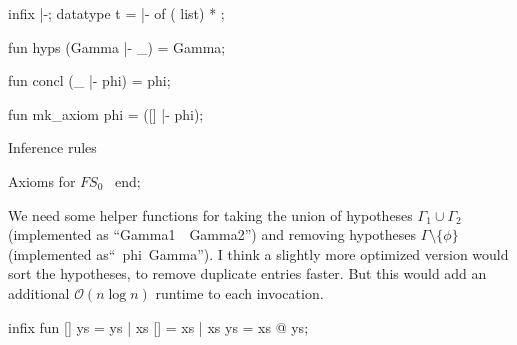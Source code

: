infix |-;
datatype t = |- of ( list) * ;

fun hyps (Gamma |- _) = Gamma;

fun concl (_ |- phi) = phi;

fun mk_axiom phi = ([] |- phi); 

\LA{}Inference rules~{\nwtagstyle{}}\RA{}

\LA{}Axioms for $FS_{0}$~{\nwtagstyle{}}\RA{}
end;
\eatline
{}\nwendcode{}\nwdocspar
\begin{node}
We need some helper functions for taking the union of hypotheses
$\Gamma_{1}\cup\Gamma_{2}$ (implemented as ``{\Tt{}Gamma1\ \ Gamma2\nwendquote}'')
and removing hypotheses $\Gamma\setminus\{\phi\}$ (implemented as``{\Tt{}\ phi\ Gamma\nwendquote}'').
I think a slightly more optimized version would sort the hypotheses,
to remove duplicate entries faster. But this would add
an additional $\mathcal{O}(n\log n)$ runtime to each invocation.
\end{node}

\nwenddocs{}\endmoddef\nwstartdeflinemarkup{}\nwenddeflinemarkup
infix 
fun []  ys = ys
  | xs  [] = xs
  | xs  ys = xs @ ys;

